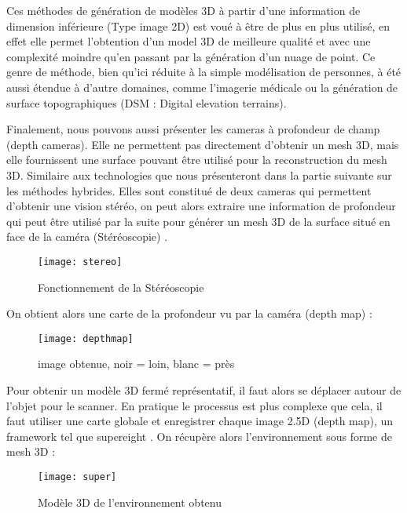 Ces méthodes de génération de modèles 3D à partir d'une information de dimension inférieure (Type image 2D) est voué à être de plus en plus utilisé, en effet elle permet l'obtention d'un model 3D de meilleure qualité et avec une complexité moindre qu'en passant par la génération d'un nuage de point. Ce genre de méthode, bien qu'ici réduite à la simple modélisation de personnes, à été aussi étendue à d'autre domaines, comme l'imagerie médicale ou la génération de surface topographiques (DSM : Digital elevation terrains)\cite{DSM}.

Finalement, nous pouvons aussi présenter les cameras à profondeur de champ (depth cameras). Elle ne permettent pas directement d'obtenir un mesh 3D, mais elle fournissent une surface pouvant être utilisé pour la reconstruction du mesh 3D. Similaire aux technologies que nous présenteront dans la partie suivante sur les méthodes hybrides.
\newline
Elles sont constitué de deux cameras qui permettent d'obtenir une vision stéréo, on peut alors extraire une information de profondeur qui peut être utilisé par la suite pour générer un mesh 3D de la surface situé en face de la caméra (Stéréoscopie) \cite{book1}.

\begin{figure}[h]
    \centering
    \texttt{[image: stereo]}
    \caption{Fonctionnement de la Stéréoscopie}
    \label{fig:pifuhdWork}
\end{figure}
\FloatBarrier

On obtient alors une carte de la profondeur vu par la caméra (depth map) :

\begin{figure}[h]
    \centering
    \texttt{[image: depthmap]}
    \caption{image obtenue, noir = loin, blanc = près}
    \label{fig:pifuhdWork}
\end{figure}
\FloatBarrier

Pour obtenir un modèle 3D fermé représentatif, il faut alors se déplacer autour de l'objet pour le scanner. En pratique le processus est plus complexe que cela, il faut utiliser une carte globale et enregistrer chaque image 2.5D (depth map), un framework tel que supereight \cite{super}.
On récupère alors l'environnement sous forme de mesh 3D :

\begin{figure}[h]
    \centering
    \texttt{[image: super]}
    \caption{Modèle 3D de l'environnement obtenu}
    \label{fig:super}
\end{figure}
\FloatBarrier

